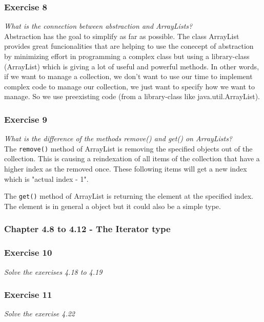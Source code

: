 \subsubsection*{Exercise 8}
\textit{What is the connection between abstraction and ArrayLists?}\\

Abstraction has the goal to simplify as far as possible. The class
ArrayList provides great funcionalities that are helping to use the 
conecept of abstraction by minimizing effort in programming a complex
class but using a library-class (ArrayList) which is giving a lot of
useful and powerful methods. In other words, if we want to manage a
collection, we don't want to use our time to implement complex code
to manage our collection, we just want to specify how we want to 
manage. So we use preexisting code (from a library-class like 
java.util.ArrayList).

\subsubsection*{Exercise 9}
\textit{What is the difference of the methods remove() and get() on
ArrayLists?}\\

The \lstinline{remove()} method of ArrayList is removing the specified
objects out of the collection. This is causing a reindexation of all
items of the collection that have a higher index as the removed once.
These following items will get a new index which is "actual index - 1".

The \lstinline{get()} method of ArrayList is returning the element at
the specified index. The element is in general a object but it could 
also be a simple type.

\subsubsection{Chapter 4.8 to 4.12 - The Iterator type}

\subsubsection*{Exercise 10}
\textit{Solve the exercises 4.18 to 4.19}\\

\subsubsection*{Exercise 11}
\textit{Solve the exercise 4.22}\\

